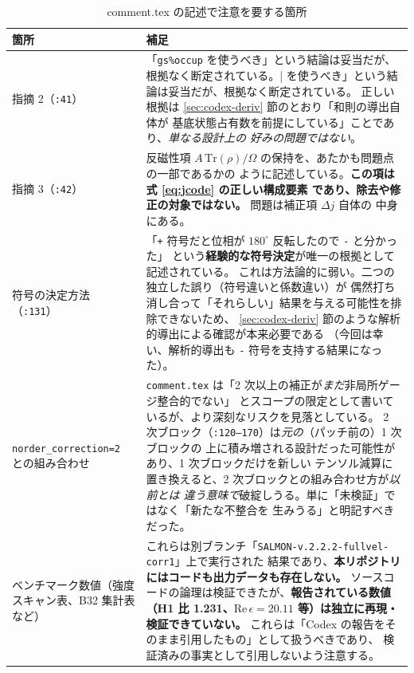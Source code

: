 \documentclass[dvipdfmx,a4paper,11pt]{jsarticle}
\newcommand{\file}[1]{\texttt{#1}}
\newcommand{\Tr}{\mathrm{Tr}}
\newcommand{\Real}{\mathrm{Re}}
\begin{document}
\begin{table}[htbp]
\centering
\caption{comment.tex の記述で注意を要する箇所}
\label{tab:codex-risky}
\begin{tabular}{@{}p{30mm}p{113mm}@{}}
\toprule
\textbf{箇所} & \textbf{補足} \\
\midrule
指摘 2\newline（\file{:41}） &
「\verb|gs%occup| を使うべき」という結論は妥当だが、根拠なく断定されている。
正しい根拠は \ref{sec:codex-deriv} 節のとおり「和則の導出自体が
基底状態占有数を前提にしている」ことであり、\emph{単なる設計上の
好みの問題ではない}。 \\[2mm]

指摘 3\newline（\file{:42}） &
反磁性項 $A\,\Tr(\rho)/\Omega$ の保持を、あたかも問題点の一部であるかの
ように記述している。\textbf{この項は式 \eqref{eq:jcode} の正しい構成要素
であり、除去や修正の対象ではない。} 問題は補正項 $\Delta j$ 自体の
中身にある。 \\[2mm]

符号の決定方法\newline（\file{:131}） &
「\texttt{+} 符号だと位相が $180^\circ$ 反転したので \texttt{-} と分かった」
という\textbf{経験的な符号決定}が唯一の根拠として記述されている。
これは方法論的に弱い。二つの独立した誤り（符号違いと係数違い）が
偶然打ち消し合って「それらしい」結果を与える可能性を排除できないため、
\ref{sec:codex-deriv} 節のような解析的導出による確認が本来必要である
（今回は幸い、解析的導出も \texttt{-} 符号を支持する結果になった）。 \\[2mm]

\file{norder\_correction}\newline\file{=2} との組み合わせ &
\file{comment.tex} は「2 次以上の補正が\emph{まだ}非局所ゲージ整合的でない」
とスコープの限定として書いているが、より深刻なリスクを見落としている。
2 次ブロック（\file{:120--170}）は\emph{元の}（パッチ前の）1 次ブロックの
上に積み増される設計だった可能性があり、1 次ブロックだけを新しい
テンソル減算に置き換えると、2 次ブロックとの組み合わせ方が\emph{以前とは
違う意味で}破綻しうる。単に「未検証」ではなく「新たな不整合を
生みうる」と明記すべきだった。 \\[2mm]

ベンチマーク数値\newline（強度スキャン表、\newline B32 集計表など） &
これらは別ブランチ「\texttt{SALMON-v.2.2.2-fullvel-corr1}」上で実行された
結果であり、\textbf{本リポジトリにはコードも出力データも存在しない。}
ソースコードの論理は検証できたが、\textbf{報告されている数値
（H1 比 1.231、$\Real\,\epsilon=20.11$ 等）は独立に再現・検証できていない。}
これらは「Codex の報告をそのまま引用したもの」として扱うべきであり、
検証済みの事実として引用しないよう注意する。 \\
\bottomrule
\end{tabular}
\end{table}
\end{document}
